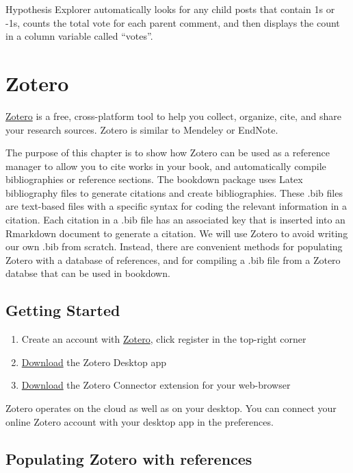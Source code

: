 \documentclass[]{book}
\providecommand{\tightlist}{%
  \setlength{\itemsep}{0pt}\setlength{\parskip}{0pt}}
\theoremstyle{definition}
\theoremstyle{definition}
\theoremstyle{definition}
\theoremstyle{remark}
\begin{document}
Hypothesis Explorer automatically looks for any child posts that contain
1s or -1s, counts the total vote for each parent comment, and then
displays the count in a column variable called ``votes''.

\chapter{Zotero}\label{zotero}

\href{https://www.zotero.org}{Zotero} is a free, cross-platform tool to
help you collect, organize, cite, and share your research sources.
Zotero is similar to Mendeley or EndNote.

The purpose of this chapter is to show how Zotero can be used as a
reference manager to allow you to cite works in your book, and
automatically compile bibliographies or reference sections. The bookdown
package uses Latex bibliography files to generate citations and create
bibliographies. These .bib files are text-based files with a specific
syntax for coding the relevant information in a citation. Each citation
in a .bib file has an associated key that is inserted into an Rmarkdown
document to generate a citation. We will use Zotero to avoid writing our
own .bib from scratch. Instead, there are convenient methods for
populating Zotero with a database of references, and for compiling a
.bib file from a Zotero databse that can be used in bookdown.

\section{Getting Started}\label{getting-started-1}

\begin{enumerate}
\def\labelenumi{\arabic{enumi}.}
\tightlist
\item
  Create an account with \href{https://www.zotero.org}{Zotero}, click
  register in the top-right corner
\item
  \href{https://www.zotero.org/download/}{Download} the Zotero Desktop
  app
\item
  \href{https://www.zotero.org/download/}{Download} the Zotero Connector
  extension for your web-browser
\end{enumerate}

Zotero operates on the cloud as well as on your desktop. You can connect
your online Zotero account with your desktop app in the preferences.

\section{Populating Zotero with
references}\label{populating-zotero-with-references}
\end{document}
